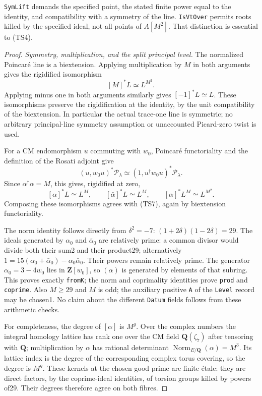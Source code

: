 \texttt{SymLift} demands the specified point, the stated finite power equal to the identity, and compatibility with a symmetry of the line. \texttt{IsVtOver} permits roots killed by the specified ideal, not all points of \(A[M^2]\). That distinction is essential to (TS4).

\begin{proof}
\emph{Symmetry, multiplication, and the split principal level.}
The normalized Poincaré line is a biextension. Applying multiplication by \(M\) in both arguments gives the rigidified isomorphism \[
 [M]^*L\simeq L^{M^2}.
 \tag{TS7}
\] Applying minus one in both arguments similarly gives \([-1]^*L\simeq L\). These isomorphisms preserve the rigidification at the identity, by the unit compatibility of the biextension. In particular the actual trace-one line is symmetric; no arbitrary principal-line symmetry assumption or unaccounted Picard-zero twist is used.

For a CM endomorphism \(u\) commuting with \(w_0\), Poincaré functoriality and the definition of the Rosati adjoint give \[
 (u,w_0u)^*\mathcal P_\lambda
 \simeq (1,u^\dagger w_0u)^*\mathcal P_\lambda.
\] Since \(\alpha^\dagger\alpha=M\), this gives, rigidified at zero, \[
 [\alpha]^*L\simeq L^M,
 \qquad [\bar\alpha]^*L\simeq L^M,
 \qquad [\alpha]^*L^M\simeq L^{M^2}.
 \tag{TS8}
\] Composing these isomorphisms agrees with (TS7), again by biextension functoriality.

The norm identity follows directly from \(\delta^2=-7\): \((1+2\delta)(1-2\delta)=29\). The ideals generated by \(\alpha_0\) and \(\bar\alpha_0\) are relatively prime: a common divisor would divide both their sum2 and their product29; alternatively \(1=15(\alpha_0+\bar\alpha_0)-\alpha_0\bar\alpha_0\). Their powers remain relatively prime. The generator \(\alpha_0=3-4w_0\) lies in \(\mathbf Z[w_0]\), so \((\alpha)\) is generated by elements of that subring. This proves exactly \texttt{fromK}; the norm and coprimality identities prove \texttt{prod} and \texttt{coprime}. Also \(M\ge29\) and \(M\) is odd; the auxiliary positive \texttt{A} of the \texttt{Level} record may be chosen1. No claim about the different \texttt{Datum} fields follows from these arithmetic checks.

For completeness, the degree of \([\alpha]\) is \(M^g\). Over the complex numbers the integral homology lattice has rank one over the CM field \(\mathbf Q(\zeta_7)\) after tensoring with \(\mathbf Q\); multiplication by \(\alpha\) has rational determinant \(\operatorname{Norm}_{E/\mathbf Q}(\alpha)=M^3\). Its lattice index is the degree of the corresponding complex torus covering, so the degree is \(M^g\). These kernels at the chosen good prime are finite étale: they are direct factors, by the coprime-ideal identities, of torsion groups killed by powers of29. Their degrees therefore agree on both fibres.


\end{proof}
